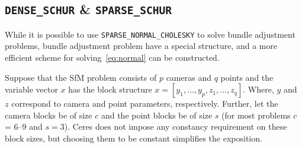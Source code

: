 \subsection{\texttt{DENSE\_SCHUR} \& \texttt{SPARSE\_SCHUR}}
While it is possible to use \texttt{SPARSE\_NORMAL\_CHOLESKY} to solve bundle adjustment problems, bundle adjustment problem have a special structure, and a more efficient scheme for solving~\eqref{eq:normal} can be constructed.

Suppose that the SfM problem consists of $p$ cameras and $q$ points and the variable vector $x$ has the  block structure $x = [y_{1},\hdots,y_{p},z_{1},\hdots,z_{q}]$. Where, $y$ and $z$ correspond to camera and point parameters, respectively.  Further, let the camera blocks be of size $c$ and the point blocks be of size $s$ (for most problems $c$ =  $6$--$9$ and $s = 3$). Ceres does not impose any constancy requirement on these block sizes, but choosing them to be constant simplifies the exposition.

